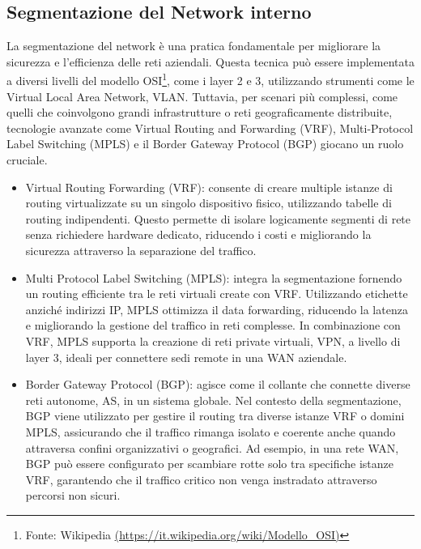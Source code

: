         \subsection{Segmentazione del Network interno}
            La segmentazione del network è una pratica fondamentale per migliorare la sicurezza e l'efficienza delle reti aziendali. Questa tecnica può essere implementata a diversi livelli del modello OSI\footnote{Fonte: Wikipedia \url{(https://it.wikipedia.org/wiki/Modello_OSI)}}, come i layer 2 e 3, utilizzando strumenti come le Virtual Local Area Network, VLAN. Tuttavia, per scenari più complessi, come quelli che coinvolgono grandi infrastrutture o reti geograficamente distribuite, tecnologie avanzate come Virtual Routing and Forwarding (VRF), Multi-Protocol Label Switching (MPLS) e il Border Gateway Protocol (BGP) giocano un ruolo cruciale.
            \begin{itemize}
                \item Virtual Routing Forwarding (VRF): consente di creare multiple istanze di routing virtualizzate su un singolo dispositivo fisico, utilizzando tabelle di routing indipendenti. Questo permette di isolare logicamente segmenti di rete senza richiedere hardware dedicato, riducendo i costi e migliorando la sicurezza attraverso la separazione del traffico.
                \item Multi Protocol Label Switching (MPLS):  integra la segmentazione fornendo un routing efficiente tra le reti virtuali create con VRF. Utilizzando etichette anziché indirizzi IP, MPLS ottimizza il data forwarding, riducendo la latenza e migliorando la gestione del traffico in reti complesse. In combinazione con VRF, MPLS supporta la creazione di reti private virtuali, VPN, a livello di layer 3, ideali per connettere sedi remote in una WAN aziendale. 
                \item Border Gateway Protocol (BGP): agisce come il collante che connette diverse reti autonome, AS, in un sistema globale. Nel contesto della segmentazione, BGP viene utilizzato per gestire il routing tra diverse istanze VRF o domini MPLS, assicurando che il traffico rimanga isolato e coerente anche quando attraversa confini organizzativi o geografici. Ad esempio, in una rete WAN, BGP può essere configurato per scambiare rotte solo tra specifiche istanze VRF, garantendo che il traffico critico non venga instradato attraverso percorsi non sicuri.
            \end{itemize}

